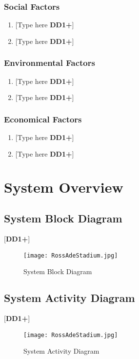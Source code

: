 \documentclass[letterpaper, 11pt]{article}
\begin{document}
\subsubsection{Social Factors}
\begin{enumerate}
    \item {[Type here \textbf{DD1+}]}
    \item {[Type here \textbf{DD1+}]}
\end{enumerate}

\subsubsection{Environmental Factors}
\begin{enumerate}
    \item {[Type here \textbf{DD1+}]}
    \item {[Type here \textbf{DD1+}]}
\end{enumerate}

\subsubsection{Economical Factors}
\begin{enumerate}
    \item {[Type here \textbf{DD1+}]}
    \item {[Type here \textbf{DD1+}]}
\end{enumerate}

\clearpage

\section{System Overview}
\subsection{System Block Diagram}
[\textbf{DD1+}]
\begin{figure}[h]
    \centering
    \texttt{[image: RossAdeStadium.jpg]} %
    \caption{System Block Diagram}
\end{figure}

\clearpage
\subsection{System Activity Diagram}
[\textbf{DD1+}]
\begin{figure}[h]
    \centering
    \texttt{[image: RossAdeStadium.jpg]} %
    \caption{System Activity Diagram}
\end{figure}
\end{document}
